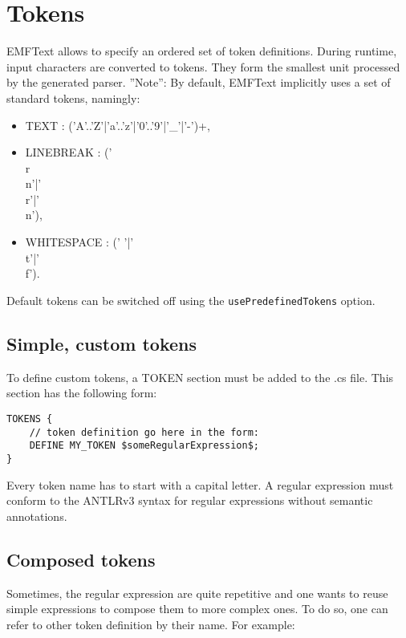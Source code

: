 \section{Tokens}

EMFText allows to specify an ordered set of token definitions. During runtime, 
input characters are converted to tokens. They form the smallest unit processed by 
the generated parser. ''Note'': By default, EMFText implicitly uses a set of standard 
tokens, namingly:

\begin{itemize}
  \item TEXT : ('A'..'Z'|'a'..'z'|'0'..'9'|'\_'|'-')+,
  \item LINEBREAK : ('\\r\\n'|'\\r'|'\\n'),
  \item WHITESPACE : (' '|'\\t'|'\\f').
\end{itemize}

Default tokens can be switched off using the \texttt{usePredefinedTokens}
option.

\subsection{Simple, custom tokens}

To define custom tokens, a TOKEN section must be added to the .cs file. This section has the following form:

\begin{lstlisting}
TOKENS {
    // token definition go here in the form:
    DEFINE MY_TOKEN $someRegularExpression$;
}
\end{lstlisting}

Every token name has to start with a capital letter. A regular expression must
conform to the ANTLRv3 syntax for regular expressions without semantic annotations.

\subsection{Composed tokens}

Sometimes, the regular expression are quite repetitive and one wants to reuse 
simple expressions to compose them to more complex ones. To do so, one can refer 
to other token definition by their name. For example:

